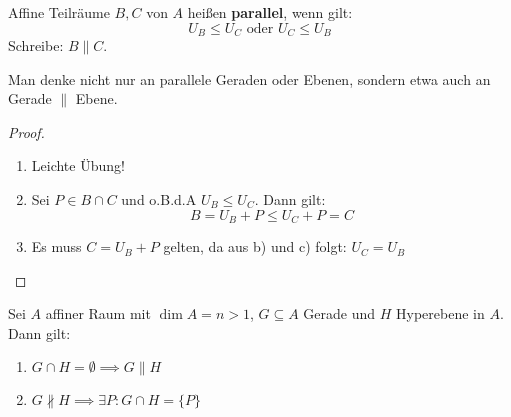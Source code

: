 \documentclass[parskip,a4paper,twoside,DIV15,BCOR12mm]{scrbook}
\begin{document}
\begin{definition}
Affine Teilräume $B,C$ von $A$ heißen \textbf{parallel}, wenn gilt:
\[U_B\le U_C \text{ oder }U_C\le U_B\]
Schreibe: $B\parallel C$.
\end{definition}

\begin{example}
Man denke nicht nur an parallele Geraden oder Ebenen, sondern etwa auch an Gerade $\parallel$ Ebene.
\end{example}

\begin{comment}
\begin{enumerate}
\item Auf den Teilräumen einer festen Dimension ist Parallelität eine Äquivalenzrelation.
\item Aus $B\parallel C$ folgt: $(B\subseteq C) \vee (B\supseteq C) \vee (B\cap C=\emptyset)$
\item Für alle $P\in A$ und alle affinen Teilräume $B\ne\emptyset$ existiert genau ein affiner Teilraum
$C$ mit:
\begin{enumerate}[(a)]
\item $P\in C$
\item $B\parallel C$
\item $\dim{C}=\dim{B}$
\end{enumerate}
\end{enumerate}
\end{comment}

\begin{proof}
\begin{enumerate}
\item Leichte Übung!
\item Sei $P\in B\cap C$ und o.B.d.A $U_B\le U_C$. Dann gilt:
\[B=U_B+P\le U_C+P=C\]
\item Es muss $C=U_B+P$ gelten, da aus b) und c) folgt: $U_C=U_B$
\end{enumerate}
\end{proof}

\begin{theo}
Sei $A$ affiner Raum mit $\dim{A}=n>1$, $G\subseteq A$ Gerade und $H$ Hyperebene in $A$.\\
Dann gilt:
\begin{enumerate}
\item $G\cap H=\emptyset \implies G\parallel H$
\item $G\not\parallel H \implies \exists P: G\cap H=\{P\}$
\end{enumerate}
\end{theo}
\end{document}
